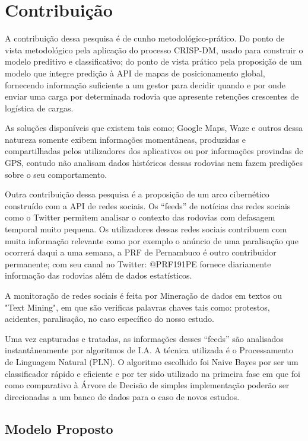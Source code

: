 \chapter{Contribuição}\label{meto}

A contribuição dessa pesquisa é de cunho metodológico-prático.
Do ponto de vista metodológico pela aplicação do processo CRISP-DM, usado para construir o modelo preditivo e classificativo; do ponto de vista prático pela proposição de um modelo que integre predição à API de mapas de posicionamento global, fornecendo informação suficiente a um gestor para decidir quando e por onde enviar uma carga por determinada rodovia que apresente retenções crescentes de logística de cargas. 

As soluções disponíveis que existem tais como; Google Maps, Waze e outros dessa natureza somente exibem informações momentâneas, produzidas e compartilhadas pelos utilizadores dos aplicativos ou por informações provindas de GPS, contudo não analisam dados históricos dessas rodovias nem fazem predições sobre o seu comportamento.

Outra contribuição dessa pesquisa é a proposição de um arco cibernético construído com a API de redes sociais.
Os ``feeds'' de notícias das redes sociais como o Twitter permitem analisar o contexto das rodovias com defasagem temporal muito pequena.
Os utilizadores dessas redes sociais contribuem com muita informação relevante como por exemplo o anúncio de uma paralisação que ocorrerá 
daqui a uma semana, a PRF de Pernambuco é outro contribuidor permanente; com seu canal no Twitter: @PRF191PE fornece diariamente informação das rodovias 
além de dados estatísticos. 

A monitoração de redes sociais é feita por Mineração de dados em textos ou "Text Mining", em que são verificas palavras chaves tais como: protestos, acidentes, paralisação, no caso específico do nosso estudo.

Uma vez capturadas e tratadas, as informações desses ``feeds'' são analisados instantâneamente por algoritmos de I.A. A técnica utilizada é o  Processamento de Linguagem Natural (PLN). O algoritmo escolhido foi Naive Bayes por ser um classificador rápido e eficiente e por ter sido utilizado na primeira fase em que foi como comparativo à Árvore de Decisão de simples implementação  poderão ser  direcionadas a um banco de dados para o caso de novos estudos.



\section{Modelo Proposto}

